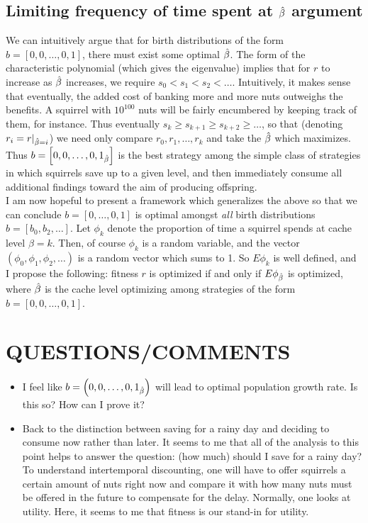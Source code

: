 \subsection{Limiting frequency of time spent at $\hat{\beta}$ argument}
We can intuitively argue that for birth distributions of the form $b = [0, 0, \ldots, 0, 1]$, there must
exist some optimal $\hat{\beta}$. The form of the characteristic polynomial (which gives the eigenvalue)
implies that for $r$ to increase as $\hat{\beta}$ increases, we require $s_0 < s_1 < s_2 < \ldots$. Intuitively,
it makes sense that eventually, the added cost of banking more and more nuts outweighs the benefits. A squirrel
with $10^{100}$ nuts will be fairly encumbered by keeping track of them, for instance. Thus eventually 
$s_k \ge s_{k+1} \ge s_{k+2} \ge \ldots$, so that (denoting $r_i = r|_{\hat{\beta} = i}$) we need only compare
$r_0, r_1, \ldots, r_k$ and take the $\hat{\beta}$ which maximizes. Thus $b = \left[ 0, 0, \ldots, 0, 1_{\hat{\beta}} \right]$
is the best strategy among the simple class of strategies in which squirrels save up to a given level, and then immediately
consume all additional findings toward the aim of producing offspring. \\ 

I am now hopeful to present a framework which generalizes the above so that we can conclude $b = \left[ 0, \ldots, 0, 1 \right]$ is
optimal amongst \textit{all} birth distributions $b = \left[ b_0, b_2, \ldots \right]$. Let $\phi_k$ denote the proportion of time
a squirrel spends at cache level $\beta = k$. Then, of course $\phi_k$ is a random variable, and the vector 
$\left( \phi_0,\phi_1, \phi_2, \ldots \right)$ is a random vector which sums to 1. So $E\phi_k$ is well defined, and I propose the following:
fitness $r$ is optimized if and only if $E\phi_{\hat{\beta}}$ is optimized, where $\hat{\beta}$ is the cache level optimizing among strategies
of the form $b = [0, 0, \ldots, 0, 1]$. 

\section{QUESTIONS/COMMENTS}

\begin{itemize}
    \item I feel like $b = \left( 0, 0, \ldots, 0, 1_{\hat{\beta}} \right)$ will lead to optimal population
        growth rate. Is this so? How can I prove it?
    \item Back to the distinction between saving for a rainy day and deciding to consume now rather than later.
        It seems to me that all of the analysis to this point helps to answer the question: (how much) should I save
        for a rainy day? To understand intertemporal discounting, one will have to offer squirrels a certain amount
        of nuts right now and compare it with how many nuts must be offered in the future to compensate for the delay.
        Normally, one looks at utility. Here, it seems to me that fitness is our stand-in for utility. 
\end{itemize}


